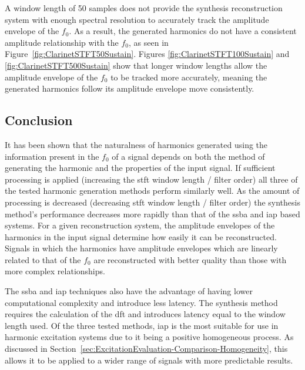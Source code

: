 		A window length of 50 samples does not provide the synthesis reconstruction system with enough spectral
		resolution to accurately track the amplitude envelope of the $f_{0}$. As a result, the generated harmonics
		do not have a consistent amplitude relationship with the $f_{0}$, as seen in
		Figure~\ref{fig:ClarinetSTFT50Sustain}. Figures \ref{fig:ClarinetSTFT100Sustain} and
		\ref{fig:ClarinetSTFT500Sustain} show that longer window lengths allow the amplitude envelope of the
		$f_{0}$ to be tracked more accurately, meaning the generated harmonics follow its amplitude envelope move
		consistently.
		
	\subsection{Conclusion}
	\label{sec:PerceptualExperiments-Reconstruction-Conclusion}
		It has been shown that the naturalness of harmonics generated using the information present in the $f_{0}$
		of a signal depends on both the method of generating the harmonic and the properties of the input signal.
		If sufficient processing is applied (increasing the \acrshort{stft} window length / filter order) all three
		of the tested harmonic generation methods perform similarly well. As the amount of processing is decreased
		(decreasing \acrshort{stft} window length / filter order) the synthesis method's performance decreases more
		rapidly than that of the \acrshort{ssba} and \acrshort{iap} based systems. For a given reconstruction
		system, the amplitude envelopes of the harmonics in the input signal determine how easily it can be
		reconstructed.  Signals in which the harmonics have amplitude envelopes which are linearly related to that
		of the $f_{0}$ are reconstructed with better quality than those with more complex relationships.
		
		The \acrshort{ssba} and \acrshort{iap} techniques also have the advantage of having lower computational
		complexity and introduce less latency. The synthesis method requires the calculation of the \acrshort{dft}
		and introduces latency equal to the window length used. Of the three tested methods, \acrshort{iap} is the
		most suitable for use in harmonic excitation systems due to it being a positive homogeneous process. As
		discussed in Section~\ref{sec:ExcitationEvaluation-Comparison-Homogeneity}, this allows it to be applied to
		a wider range of signals with more predictable results.

